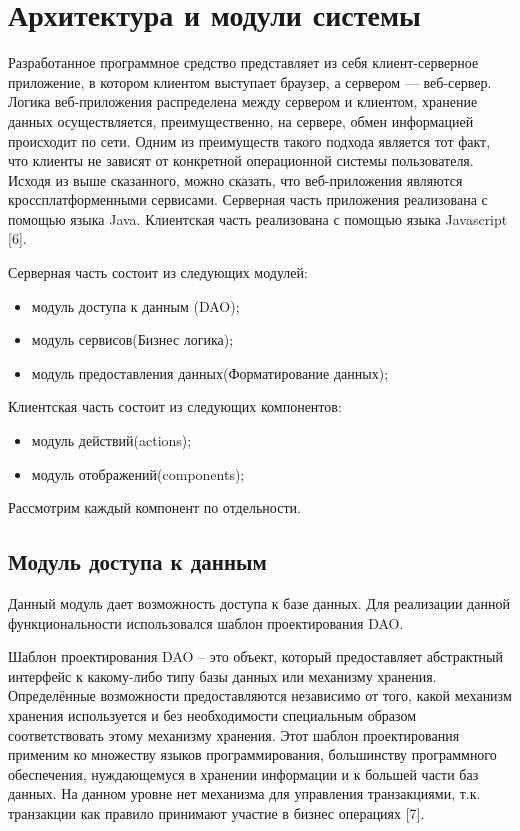 
\section{Архитектура и модули системы} %
\label{sec:arch_and_mod}

Разработанное программное средство представляет из себя клиент-серверное приложение, в котором клиентом выступает браузер, а сервером — веб-сервер. Логика веб-приложения распределена между сервером и клиентом, хранение данных осуществляется, преимущественно, на сервере, обмен информацией происходит по сети. Одним из преимуществ такого подхода является тот факт, что клиенты не зависят от конкретной операционной системы пользователя. Исходя из выше сказанного, можно сказать, что веб-приложения являются кроссплатформенными сервисами. Серверная часть приложения реализована с помощью языка Java. Клиентская часть реализована с помощью языка Javascript [6].

Серверная часть состоит из следующих модулей:
\begin{itemize}
	\item модуль доступа к данным (DAO);
	\item модуль сервисов(Бизнес логика);
	\item модуль предоставления данных(Форматирование данных);
\end{itemize}

Клиентская часть состоит из следующих компонентов:
\begin{itemize}
	\item модуль действий(actions);
	\item модуль отображений(components);
\end{itemize}

Рассмотрим каждый компонент по отдельности. 

\subsection{Модуль доступа к данным}
\label{sub:arch_and_mod:lexer}

Данный модуль дает возможность доступа к базе данных. Для реализации данной функциональности использовался шаблон проектирования DAO. 

Шаблон проектирования DAO -- это объект, который предоставляет абстрактный интерфейс к какому-либо типу базы данных или механизму хранения. Определённые возможности предоставляются независимо от того, какой механизм хранения используется и без необходимости специальным образом соответствовать этому механизму хранения. Этот шаблон проектирования применим ко множеству языков программирования, большинству программного обеспечения, нуждающемуся в хранении информации и к большей части баз данных. На данном  уровне нет механизма для управления транзакциями, т.к. транзакции как правило принимают участие в бизнес операциях [7].  

